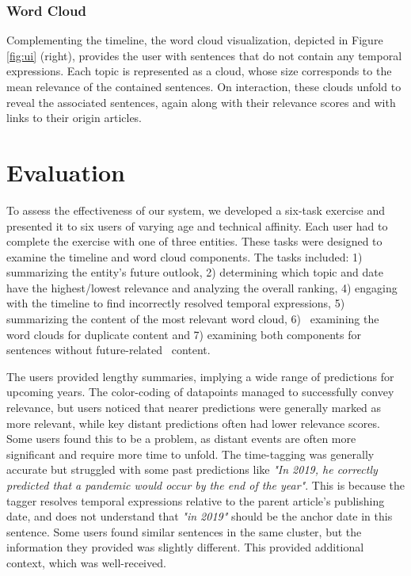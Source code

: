 \documentclass[sigconf]{acmart}
\begin{document}
\subsubsection{Word Cloud}
Complementing the timeline, the word cloud visualization, depicted in Figure \ref{fig:ui} (right), provides the user with sentences that do not contain any temporal expressions. Each topic is represented as a cloud, whose size corresponds to the mean relevance of the contained sentences. On interaction, these clouds unfold to reveal the associated sentences, again along with their relevance scores and with links to their origin articles.

\section{Evaluation}
To assess the effectiveness of our system, we developed a six-task exercise and presented it to six users of varying age and technical affinity. Each user had to complete the exercise with one of three entities. These tasks were designed to examine the timeline and word cloud components. The tasks included: 1) summarizing the entity's future outlook, 2) determining which topic and date have the highest/lowest relevance and analyzing the overall ranking, 4) engaging with the timeline to find incorrectly resolved temporal expressions, 5) summarizing the content of the most relevant word cloud, 6)~ examining the word clouds for duplicate content and 7) examining both components for sentences without future-related~ content.

The users provided lengthy summaries, implying a wide range of predictions for upcoming years. The color-coding of datapoints managed to successfully convey relevance, but users noticed that nearer predictions were generally marked as more relevant, while key distant predictions often had lower relevance scores. Some users found this to be a problem, as distant events are often more significant and require more time to unfold. The time-tagging was generally accurate but struggled with some past predictions like \textit{"In 2019, he correctly predicted that a pandemic would occur by the end of the year"}. This is because the tagger resolves temporal expressions relative to the parent article's publishing date, and does not understand that \textit{"in 2019"} should be the anchor date in this sentence. Some users found similar sentences in the same cluster, but the information they provided was slightly different. This provided additional context, which was well-received.
\end{document}
